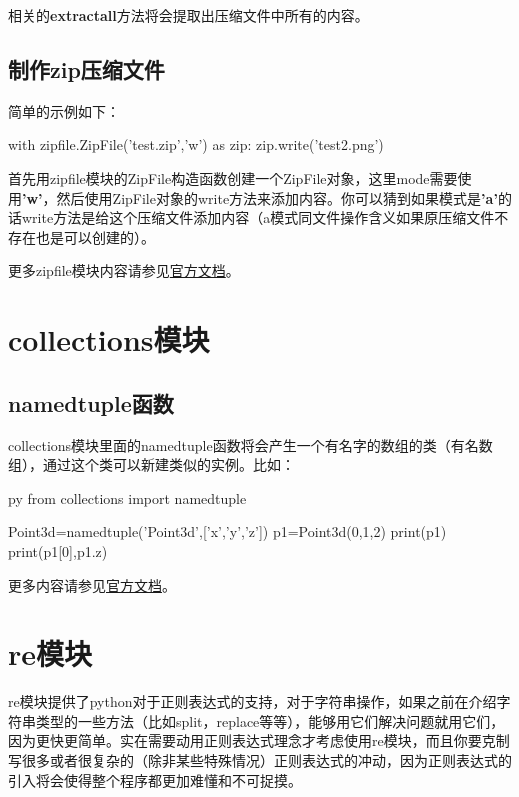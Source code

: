 \documentclass[12pt,oneside]{book}
\begin{document}
\begin{common-format}
相关的\textbf{extractall}方法将会提取出压缩文件中所有的内容。

\section{制作zip压缩文件}
简单的示例如下：
\begin{tcbpython}[]
with zipfile.ZipFile('test.zip','w') as zip:
    zip.write('test2.png')
\end{tcbpython}
首先用zipfile模块的ZipFile构造函数创建一个ZipFile对象，这里mode需要使用\textbf{'w'}，然后使用ZipFile对象的write方法来添加内容。你可以猜到如果模式是\textbf{'a'}的话write方法是给这个压缩文件添加内容（a模式同文件操作含义如果原压缩文件不存在也是可以创建的）。



\begin{large}
更多zipfile模块内容请参见\href{https://docs.python.org/3.4/library/zipfile.html}{官方文档}。
\end{large}


\chapter{collections模块}
\section{namedtuple函数}
collections模块里面的namedtuple函数将会产生一个有名字的数组的类（有名数组），通过这个类可以新建类似的实例。比如：
\begin{xverbatim}[129]{py}
from collections import namedtuple

Point3d=namedtuple('Point3d',['x','y','z'])
p1=Point3d(0,1,2)
print(p1)
print(p1[0],p1.z)
\end{xverbatim}




\begin{large}
更多内容请参见\href{https://docs.python.org/3/library/collections.html}{官方文档}。
\end{large}



\chapter{re模块}
\label{sec:re模块}
re模块提供了python对于正则表达式的支持，对于字符串操作，如果之前在介绍字符串类型的一些方法（比如split，replace等等），能够用它们解决问题就用它们，因为更快更简单。实在需要动用正则表达式理念才考虑使用re模块，而且你要克制写很多或者很复杂的（除非某些特殊情况）正则表达式的冲动，因为正则表达式的引入将会使得整个程序都更加难懂和不可捉摸。


\end{common-format}
\end{document}

